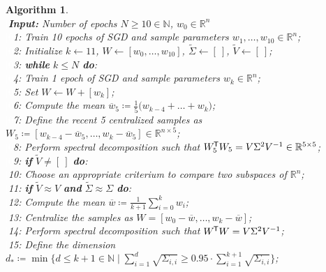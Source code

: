 \documentclass[11pt, a4paper]{article}
\newtheorem{algorithm}[theorem]{Algorithm}
\newcommand{\N}{\mathbb{N}}
\newcommand{\R}{\mathbb{R}}
\newcommand*{\tr}{^{\mkern-1.5mu\mathsf{T}}}
\begin{document}
\begin{algorithm}
\caption{ Sketch of Future Algorithm \textcolor{white}{$\Big |$}} \ \\
\textcolor{white}{$\Big |$}\textbf{Input:} Number of epochs $N \geq 10 \in \N$, $w_0 \in \R^n$ \\
\textcolor{white}{$\Big |0$}1: Train 10 epochs of SGD and sample parameters $w_1, \dots, w_{10} \in \R^n$; \\
\textcolor{white}{$\Big |0$}2: Initialize $k \leftarrow 11$, $W \leftarrow [ w_0, \dots, w_{10} ]$, $\tilde{\Sigma} \leftarrow [ \ ]$, $\tilde{V} \leftarrow [ \ ]$; \\
\textcolor{white}{$\Big |0$}3: \textbf{while} $k\leq N$ \textbf{do}: \\
\textcolor{white}{$\Big |0$}4: \quad Train 1 epoch of SGD and sample parameters $w_k \in \R^n$; \\
\textcolor{white}{$\Big |0$}5: \quad Set $W \leftarrow W + [w_k]$; \\
\textcolor{white}{$\Big |0$}6: \quad Compute the mean $\overline{w}_5 \coloneq \frac{1}{5} \big ( w_{k-4} + \dots + w_k \big )$; \\
\textcolor{white}{$\Big |0$}7: \quad Define the recent 5 centralized samples as $W_5 \coloneq [w_{k-4} - \overline{w}_5, \dots, w_k - \overline{w}_5] \in \R^{n \times 5}$; \\
\textcolor{white}{$\Big |0$}8: \quad Perform spectral decomposition such that $W_5\tr W_5 = V\Sigma^2V^{-1} \in \R^{5 \times 5}$; \\
\textcolor{white}{$\Big |0$}9: \quad \textbf{if} $\tilde{V} \neq [ \ ]$ \textbf{do}: \\
\textcolor{white}{$\Big |$}10: \quad \quad Choose an appropriate criterium to compare two subspaces of $\R^n$; \\
\textcolor{white}{$\Big |$}11: \quad \quad \textbf{if} $\tilde{V} \approx V$ \textbf{and} $\tilde{\Sigma} \approx \Sigma$ \textbf{do}: \\
\textcolor{white}{$\Big |$}12: \quad \quad \quad Compute the mean $\overline{w} \coloneq \frac{1}{k+1} \sum_{i=0}^{k} w_i$; \\
\textcolor{white}{$\Big |$}13: \quad \quad \quad Centralize the samples as $W = [w_0-\overline{w}, \dots, w_k - \overline{w}]$; \\
\textcolor{white}{$\Big |$}14: \quad \quad \quad Perform spectral decomposition such that $W\tr W = V \Sigma^2 V^{-1}$;  \\
\textcolor{white}{$\Big |$}15: \quad \quad \quad Define the dimension $d_* \coloneq \min \big \{ d \leq k+1 \in \N \mid \sum_{i=1}^{d} \sqrt{\Sigma_{i,i}} \geq 0.95 \cdot \sum_{i=1}^{k+1} \sqrt{\Sigma_{i,i}} \big \}$; \\

\end{algorithm}
\end{document}
